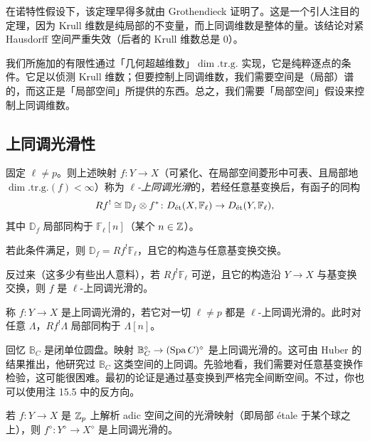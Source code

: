 \begin{remark}
在诺特性假设下，该定理早得多就由 Grothendieck 证明了。这是一个引人注目的定理，因为 Krull 维数是纯局部的不变量，而上同调维数是整体的量。该结论对紧 Hausdorff 空间严重失效（后者的 Krull 维数总是 $0$）。
\end{remark}

我们所施加的有限性通过「几何超越维数」$\dim.\mathrm{tr.g.}$ 实现，它是纯粹逐点的条件。它足以侦测 Krull 维数；但要控制上同调维数，我们需要空间是（局部）谱的，而这正是「局部空间」所提供的东西。总之，我们需要「局部空间」假设来控制上同调维数。


\subsection{上同调光滑性}

\begin{definition}
固定 $\ell\ne p$。则上述映射 $f\colon Y\to X$（可紧化、在局部空间菱形中可表、且局部地 $\dim.\mathrm{tr.g.}(f)<\infty$）称为 \emph{$\ell$-上同调光滑}的，若经任意基变换后，有函子的同构
\[
Rf^!\cong\mathbb{D}_f\otimes f^*\colon D_{\et}(X,\mathbb{F}_\ell)\to D_{\et}(Y,\mathbb{F}_\ell),
\]
其中 $\mathbb{D}_f$ 局部同构于 $\mathbb{F}_\ell[n]$（某个 $n\in\ZZ$）。
\end{definition}

\begin{remark}
若此条件满足，则 $\mathbb{D}_f=Rf^!\mathbb{F}_\ell$，且它的构造与任意基变换交换。

反过来（这多少有些出人意料），若 $Rf^!\mathbb{F}_\ell$ 可逆，且它的构造沿 $Y\to X$ 与基变换交换，则 $f$ 是 $\ell$-上同调光滑的。
\end{remark}

\begin{definition}
称 $f\colon Y\to X$ 是上同调光滑的，若它对一切 $\ell\ne p$ 都是 $\ell$-上同调光滑的。此时对任意 $\Lambda$，$Rf^!\Lambda$ 局部同构于 $\Lambda[n]$。
\end{definition}

\begin{example}
回忆 $\mathbb{B}_C$ 是闭单位圆盘。映射 $\mathbb{B}_C^\diamond\to(\Spa C)^\diamond$ 是上同调光滑的。这可由 Huber 的结果推出，他研究过 $\mathbb{B}_C$ 这类空间的上同调。先验地看，我们需要对任意基变换作检验，这可能很困难。最初的论证是通过基变换到严格完全间断空间。不过，你也可以使用注 15.5 中的反方向。
\end{example}

\begin{example}
若 $f\colon Y\to X$ 是 $\Zp$ 上解析 adic 空间之间的光滑映射（即局部 étale 于某个球之上），则 $f^\diamond\colon Y^\diamond\to X^\diamond$ 是上同调光滑的。
\end{example}

